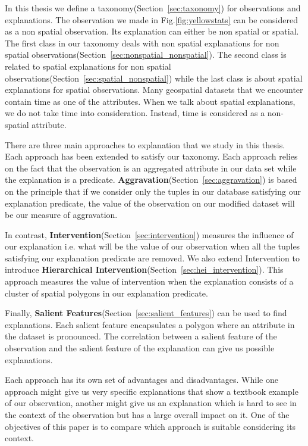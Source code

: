 In this thesis we define a taxonomy(Section~\ref{sec:taxonomy}) for observations and explanations.  The observation we made in Fig.\ref{fig:yellowstats} can be considered as a non spatial observation. Its explanation can either be non spatial or spatial. The first class in our taxonomy deals with non spatial explanations for non spatial observations(Section~\ref{sec:nonspatial_nonspatial}). The second class is related to spatial explanations for non spatial observations(Section~\ref{sec:spatial_nonspatial}) while the last class is about spatial explanations for spatial observations. Many geospatial datasets that we encounter contain time as one of the attributes. When we talk about spatial explanations, we do not take time into consideration. Instead, time is considered as a non-spatial attribute.

There are three main approaches to explanation that we study in this thesis. Each approach has been extended to satisfy our taxonomy. Each approach relies on the fact that the observation is an aggregated attribute in our data set while the explanation is a predicate. \textbf{Aggravation}(Section~\ref{sec:aggravation}) is based on the principle that if we consider only the tuples in our database satisfying our explanation predicate, the value of the observation on our modified dataset will be our measure of aggravation\citep{roy2014formal,meliou2014causality}.

In contrast, \textbf{Intervention}(Section~\ref{sec:intervention}) measures the influence of our explanation i.e. what will be the value of our observation when all the tuples satisfying our explanation predicate are removed\citep{roy2014formal}. We also extend Intervention to introduce \textbf{Hierarchical Intervention}(Section~\ref{sec:hei_intervention}). This approach measures the value of intervention when the explanation consists of a cluster of spatial polygons in our explanation predicate.

Finally, \textbf{Salient Features}(Section~\ref{sec:salient_features}) can be used to find explanations\citep{chirigati2016data}. Each salient feature encapsulates a polygon where an attribute in the dataset is pronounced. The correlation between a salient feature of the observation and the salient feature of the explanation can give us possible explanations.

Each approach has its own set of advantages and disadvantages. While one approach might give us very specific explanations that show a textbook example of our observation, another might give us an explanation which is hard to see in the context of the observation but has a large overall impact on it. One of the objectives of this paper is to compare which approach is suitable considering its context.

